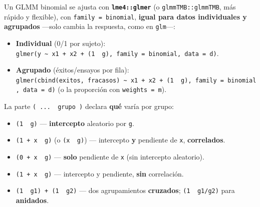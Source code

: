 \documentclass[
  letterpaper,
  DIV=11,
  numbers=noendperiod]{scrartcl}
\providecommand{\tightlist}{%
  \setlength{\itemsep}{0pt}\setlength{\parskip}{0pt}}\usepackage{longtable,booktabs,array}
\begin{document}
\begin{tcolorbox}[enhanced jigsaw, coltitle=black, rightrule=.15mm, arc=.35mm, leftrule=.75mm, colback=white, colbacktitle=quarto-callout-tip-color!10!white, left=2mm, breakable, toptitle=1mm, toprule=.15mm, bottomtitle=1mm, titlerule=0mm, title=\textcolor{quarto-callout-tip-color}{\faLightbulb}\hspace{0.5em}{🔧 En R. La sintaxis \texttt{(\ \textbar{}\ )} para cada estructura}, bottomrule=.15mm, opacityback=0, opacitybacktitle=0.6, colframe=quarto-callout-tip-color-frame]

Un GLMM binomial se ajusta con \textbf{\texttt{lme4::glmer}} (o
\texttt{glmmTMB::glmmTMB}, más rápido y flexible), con
\texttt{family\ =\ binomial}, \textbf{igual para datos individuales y
agrupados} ---solo cambia la respuesta, como en \texttt{glm}---:

\begin{itemize}
\tightlist
\item
  \textbf{Individual} (0/1 por sujeto):
  \texttt{glmer(y\ \textasciitilde{}\ x1\ +\ x2\ +\ (1\ \textbar{}\ g),\ family\ =\ binomial,\ data\ =\ d)}.
\item
  \textbf{Agrupado} (éxitos/ensayos por fila):
  \texttt{glmer(cbind(exitos,\ fracasos)\ \textasciitilde{}\ x1\ +\ x2\ +\ (1\ \textbar{}\ g),\ family\ =\ binomial,\ data\ =\ d)}
  (o la proporción con \texttt{weights\ =\ m}).
\end{itemize}

La parte \texttt{(\ ...\ \textbar{}\ grupo\ )} declara \textbf{qué}
varía por grupo:

\begin{itemize}
\tightlist
\item
  \texttt{(1\ \textbar{}\ g)} --- \textbf{intercepto} aleatorio por
  \texttt{g}.
\item
  \texttt{(1\ +\ x\ \textbar{}\ g)} (o \texttt{(x\ \textbar{}\ g)}) ---
  intercepto \textbf{y} pendiente de \texttt{x}, \textbf{correlados}.
\item
  \texttt{(0\ +\ x\ \textbar{}\ g)} --- \textbf{solo} pendiente de
  \texttt{x} (sin intercepto aleatorio).
\item
  \texttt{(1\ +\ x\ \textbar{}\textbar{}\ g)} --- intercepto y
  pendiente, \textbf{sin} correlación.
\item
  \texttt{(1\ \textbar{}\ g1)\ +\ (1\ \textbar{}\ g2)} --- dos
  agrupamientos \textbf{cruzados}; \texttt{(1\ \textbar{}\ g1/g2)} para
  \textbf{anidados}.
\end{itemize}

\end{tcolorbox}
\end{document}
